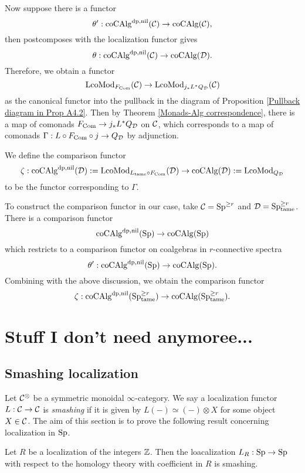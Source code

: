 Now suppose there is a functor
$$
\theta': \operatorname{coCAlg}^{\operatorname{dp}, \operatorname{nil}}({\mathcal{C}}) \to \operatorname{coCAlg}({\mathcal{C}}),
$$
then postcomposes with the localization functor gives
$$
\theta: \operatorname{coCAlg}^{\operatorname{dp}, \operatorname{nil}}({\mathcal{C}}) \to \operatorname{coCAlg}({\mathcal{D}}).
$$
Therefore, we obtain a functor 
$$
\operatorname{LcoMod}_{F_{\operatorname{Com}}}({\mathcal{C}}) \to
\operatorname{LcoMod}_{j_*L^*Q_{\mathcal{D}}}({\mathcal{C}})
$$
as the canonical functor into the pullback in the diagram of Proposition \ref{Pullback diagram in Prop A4.2}. 
Then by Theorem \ref{Monads-Alg correspondence}, there is a map of comonads
$F_{\operatorname{Com}}\to j_*L^*Q_{\mathcal{D}}$ on ${\mathcal{C}}$, which corresponds to a map of comonads 
$\Gamma:L\circ F_{\operatorname{Com}}\circ j \to Q_{{\mathcal{D}}}$ by adjunction.
\begin{definition}
    We define the comparison functor
    \[
    \zeta: \operatorname{coCAlg}^{\operatorname{dp},\operatorname{nil}}({\mathcal{D}}) :=\operatorname{LcoMod}_{L_{\operatorname{\operatorname{tame}}}\circ F_{\operatorname{Com}}}({\mathcal{D}}) \to \operatorname{coCAlg}({\mathcal{D}}):=\operatorname{LcoMod}_{Q_{{\mathcal{D}}}}
    \]
    to be the functor corresponding to $\Gamma$.
\end{definition}

To construct the comparison functor in our case, take ${\mathcal{C}}=\operatorname{Sp}^{\geq r}$ and ${\mathcal{D}}=\operatorname{Sp}^{\geq r}_{\operatorname{\operatorname{tame}}}$. There is a comparison functor 
$$
\operatorname{coCAlg}^{\operatorname{dp}, \operatorname{nil}}(\operatorname{Sp}) \to \operatorname{coCAlg}(\operatorname{Sp})
$$
which restricts to a comparison functor on coalgebras in $r$-connective spectra
$$
\theta': \operatorname{coCAlg}^{\operatorname{dp}, \operatorname{nil}}(\operatorname{Sp}) \to \operatorname{coCAlg}(\operatorname{Sp}).
$$
Combining with the above discussion, we obtain the comparison functor
\[
\zeta:\operatorname{coCAlg}^{\operatorname{dp},\operatorname{nil}}(\operatorname{Sp}^{\geq r}_{\operatorname{\operatorname{tame}}}) \to
\operatorname{coCAlg}(\operatorname{Sp}^{\geq r}_{\operatorname{\operatorname{tame}}}).
\]











\section{Stuff I don't need anymoree...}

\subsection{Smashing localization}
Let ${\mathcal{C}}^{\otimes}$ be a symmetric monoidal $\infty$-category. We say a localization functor $L:{\mathcal{C}}\to{\mathcal{C}}$ is \emph{smashing} if it is given by $L(-)\simeq (-)\otimes X$ for some object $X\in{\mathcal{C}}$.
The aim of this section is to prove the following result concerning localization in $\operatorname{Sp}$.

\begin{proposition}
\label{HR is smashing}
	Let $R$ be a localization of the integers ${\mathbb{Z}}$. Then the loacalization $L_R:\operatorname{Sp}\to \operatorname{Sp}$ with respect to the homology theory with coefficient in $R$ is smashing.
\end{proposition}


